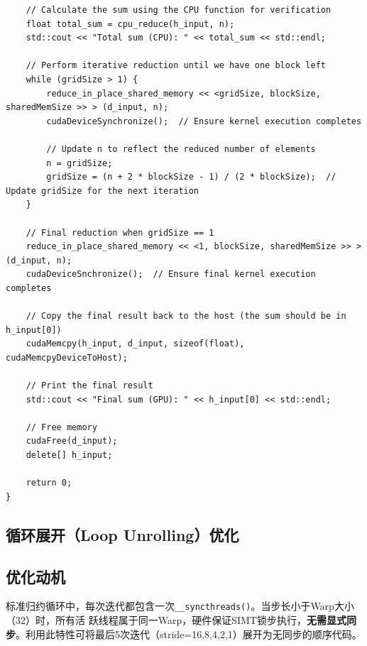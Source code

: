 \begin{lstlisting}
    // Calculate the sum using the CPU function for verification
    float total_sum = cpu_reduce(h_input, n);
    std::cout << "Total sum (CPU): " << total_sum << std::endl;

    // Perform iterative reduction until we have one block left
    while (gridSize > 1) {
        reduce_in_place_shared_memory << <gridSize, blockSize, sharedMemSize >> > (d_input, n);
        cudaDeviceSynchronize();  // Ensure kernel execution completes

        // Update n to reflect the reduced number of elements
        n = gridSize;
        gridSize = (n + 2 * blockSize - 1) / (2 * blockSize);  // Update gridSize for the next iteration
    }

    // Final reduction when gridSize == 1
    reduce_in_place_shared_memory << <1, blockSize, sharedMemSize >> > (d_input, n);
    cudaDeviceSnchronize();  // Ensure final kernel execution completes

    // Copy the final result back to the host (the sum should be in h_input[0])
    cudaMemcpy(h_input, d_input, sizeof(float), cudaMemcpyDeviceToHost);

    // Print the final result
    std::cout << "Final sum (GPU): " << h_input[0] << std::endl;

    // Free memory
    cudaFree(d_input);
    delete[] h_input;

    return 0;
}
\end{lstlisting}

\subsection{循环展开（Loop Unrolling）优化}
\subsection{优化动机}
标准归约循环中，每次迭代都包含一次\verb|__syncthreads()|。当步长小于Warp大小（32）时，所有活
跃线程属于同一Warp，硬件保证SIMT锁步执行，\textbf{无需显式同步}。利用此特性可将最后5次迭代（stride=16,8,4,2,1）展开为无同步的顺序代码。

